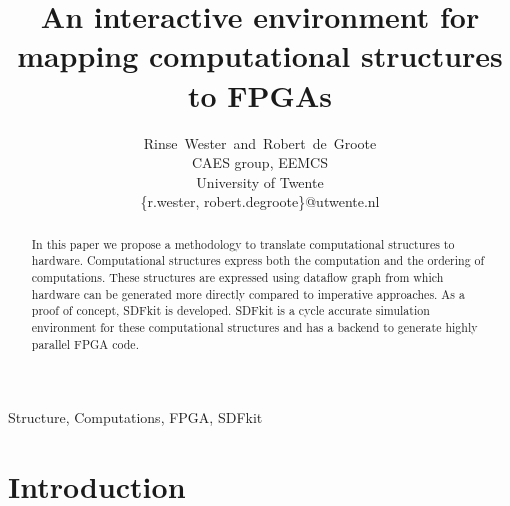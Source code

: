 \documentclass[journal]{IEEEtran}
\begin{document}
%
\title{An interactive environment for mapping computational structures to FPGAs}
%
%
%

\author{Rinse~Wester~and~Robert~de~Groote \\CAES group, EEMCS\\ University of Twente\\ \{r.wester, robert.degroote\}@utwente.nl}

\maketitle


\begin{abstract}
  In this paper we propose a methodology to translate computational structures to hardware.
  Computational structures express both the computation and the ordering of computations.
  These structures are expressed using dataflow graph from which hardware can be generated more directly compared to imperative approaches.
  As a proof of concept, SDFkit is developed.
  SDFkit is a cycle accurate simulation environment for these computational structures and has a backend to generate highly parallel FPGA code.
\end{abstract}

\begin{IEEEkeywords}
  Structure, Computations, FPGA, SDFkit
\end{IEEEkeywords}


\IEEEpeerreviewmaketitle

\section{Introduction}
  
\end{document}
